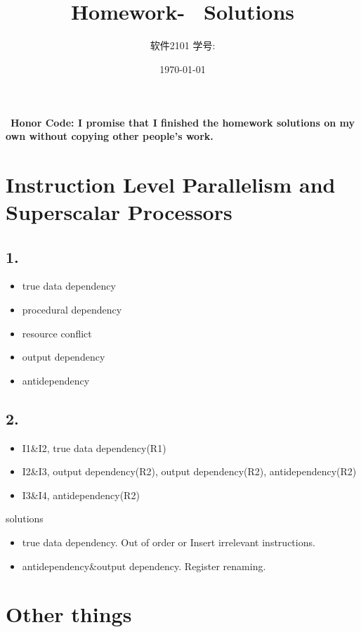 \documentclass[11pt]{article}  %
\title{\vspace{-4cm}\CourseCodeName \space
        \Session \protect\\  Homework-~\textbf{\Homework} Solutions}
\author{软件2101 \Name \space 学号: \SID}
\date{\today}
\begin{document}
\maketitle

~\textbf{Honor Code: I promise that I finished the homework solutions on my own without copying other people's 
    work.}
    
\section*{Instruction Level Parallelism and Superscalar Processors}

\subsection*{1. }

\begin{itemize}
    \item true data dependency
    \item procedural dependency
    \item resource conflict
    \item output dependency
    \item antidependency
\end{itemize}

\subsection*{2. }

\begin{itemize}
    \item I1\&I2, true data dependency(R1)
    \item I2\&I3, output dependency(R2), output dependency(R2), antidependency(R2)
    \item I3\&I4, antidependency(R2)
\end{itemize}

solutions
\begin{itemize}
    \item true data dependency. Out of order or Insert irrelevant instructions.
    \item antidependency\&output dependency. Register renaming.
\end{itemize}


\section*{Other things}
\end{document}
